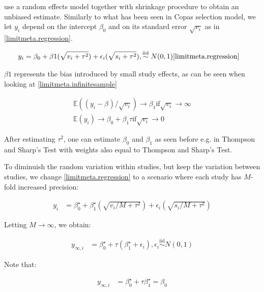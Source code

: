 \documentclass[11pt,a4paper,twoside]{book}\usepackage[]{graphicx}\usepackage[]{color}
\begin{document}
\citet{limitmeta} use a random effects model together with shrinkage procedure to obtain an unbiased estimate. Similarly to what has been seen in Copas selection model, we let $y_{i}$ depend on the intercept $\beta_{0}$ and on its standard error $\sqrt{v_{i}}$ as in \ref{limitmeta.regression}.

\begin{align}
y_{i}& = \beta_{0} + \beta{1}(\sqrt{v_{i} + \tau^2}) + \epsilon_{i}(\sqrt{s_{i} + \tau^2}), \stackrel{\textrm{iid}}{\sim} N(0,1)  \ref{limitmeta.regression}
\end{align}

$\beta{1}$ represents the bias introduced by small study effects, as can be seen when looking at \ref{limitmeta.infinitesample}

\begin{align}
\mathbb{E}((y_{i} - \beta_{})/\sqrt{v_{i}}) \rightarrow \beta_{1} \textrm{if} \sqrt{v_{i}} \rightarrow \infty \\
\mathbb{E}(y_{i}) \rightarrow \beta_{0} + \beta_{1}\tau \textrm{if} \sqrt{v_{i}} \rightarrow 0 
\end{align}

After estimating $\tau^2$, one can estimate $\beta_{0}$ and $\beta_{1}$ as seen before e.g. in Thompson and Sharp's Test with weights also equal to Thompson and Sharp's Test.

\vspace{0mm}
To diminuish the random variation within studies, but keep the variation between studies, we change \ref{limitmeta.regression} to a scenario where each study has $M$-fold increased precision:

\begin{align}
y_{i} &= \beta_{0}^\star + \beta_{1}^\star(\sqrt{v_{i}/M + \tau^2}) + \epsilon_{i}(\sqrt{s_{i}/M + \tau^2}) \label{limitmeta.regression}
\end{align}

Letting $M \rightarrow \infty$, we obtain:

\begin{align}
y_{\infty,i} &= \beta_{0}^\star + \tau(\beta_{1}^\star + \epsilon_{i}),  \epsilon_{i} \stackrel{\textrm{iid}}{\sim} N(0,1) \label{limitmeta.regression.infinity}
\end{align}

Note that:

\begin{align}
y_{\infty,i} &= \beta_{0}^\star + \tau\beta_{1}^\star = \beta_{0}
\end{align}
\end{document}

